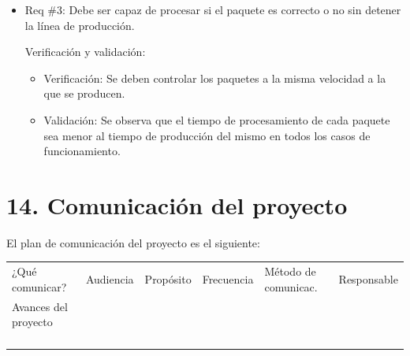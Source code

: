 \documentclass[11pt]{charter}
\begin{document}
\begin{itemize} 
\item Req \#3: Debe ser capaz de procesar si el paquete es correcto o no sin detener la línea de producción.

Verificación y validación:

\begin{itemize}
\item Verificación: Se deben controlar los paquetes a la misma velocidad a la que se producen.
\item Validación: Se observa que el tiempo de procesamiento de cada paquete sea menor al tiempo de producción del mismo en todos los casos de funcionamiento.

\end{itemize}

\end{itemize}




\section{14. Comunicación del proyecto}
\label{sec:comunicaciones}

El plan de comunicación del proyecto es el siguiente:

\begin{table}[htpb]
\centering
\begin{tabularx}{\linewidth}{@{}|X|C{2.4cm}|C{3cm}|C{1.8cm}|C{2cm}|C{2.1cm}|@{}}
\hline
{} 
           \\ \hline
{} 
¿Qué comunicar? & Audiencia & Propósito & Frecuencia & Método de comunicac. & Responsable \\ \hline
Avances del proyecto             &           &           &            &                      &             \\ \hline
                &           &           &            &                      &             \\ \hline
                &           &           &            &                      &             \\ \hline
                &           &           &            &                      &             \\ \hline
                &           &           &            &                      &             \\ \hline
\end{tabularx}
\end{table}
\end{document}
